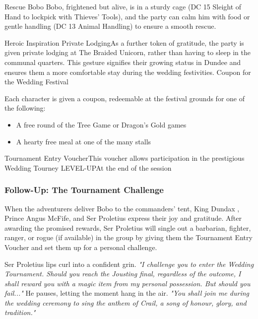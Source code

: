 \begin{DndQuestHook}[width=0.5\textwidth - 4pt]{Rescue Bobo}
{		Bobo, frightened but alive, is in a sturdy cage (DC 15 Sleight of Hand to lockpick with Thieves' Tools), and the party can calm him with food or gentle handling (DC 13 Animal Handling) to ensure a smooth rescue.
	}
	
	{%
		{Heroic Inspiration}{}%
		{Private Lodging}{As a further token of gratitude, the party is given private lodging at The Braided Unicorn, rather than having to sleep in the communal quarters. This gesture signifies their growing status in Dundee and ensures them a more comfortable stay during the wedding festivities.}
		{Coupon for the Wedding Festival}{%
			Each character is given a coupon, redeemable at the festival grounds for one of the following:
			\begin{itemize}
				\item A free round of the Tree Game or Dragon's Gold games
				\item A hearty free meal at one of the many stalls
			\end{itemize}
		}%
		{Tournament Entry Voucher}{This voucher allows participation in the prestigious Wedding Tourney}%
		{LEVEL-UP}{At the end of the session}
	}%
\end{DndQuestHook}

\subsubsection*{Follow-Up: The Tournament Challenge}
{\entryfont\noindent When the adventurers deliver Bobo to the commanders' tent, King Dundax , Prince Angus McFife, and Ser Proletius express their joy and gratitude. After awarding the promised rewards, Ser Proletius will single out a barbarian, fighter, ranger, or rogue (if available) in the group by giving them the Tournament Entry Voucher and set them up for a personal challenge.}

\begin{DndReadAloud}
	Ser Proletius lips curl into a confident grin. \textit{"I challenge you to enter the Wedding Tournament. Should you reach the Jousting final, regardless of the outcome, I shall reward you with a magic item from my personal possession. But should you fail..."} He pauses, letting the moment hang in the air. \textit{"You shall join me during the wedding ceremony to sing the anthem of Crail, a song of honour, glory, and tradition."}
\end{DndReadAloud}

